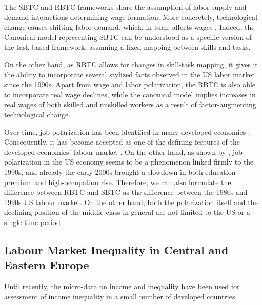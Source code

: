 \documentclass[11pt]{article}
\begin{document}
The SBTC and RBTC frameworks share the assumption of labor supply and demand interactions determining wage formation. More concretely, technological change causes shifting labor demand, which, in turn, affects wages \citep{mishel2013assessing}. Indeed, the Canonical model representing SBTC can be understood as a specific version of the task-based framework, assuming a fixed mapping between skills and tasks.

On the other hand, as RBTC allows for changes in skill-task mapping, it gives it the ability to incorporate several stylized facts observed in the US labor market since the 1990s. Apart from wage and labor polarization, the RBTC is also able to incorporate real wage declines, while the canonical model implies increases in real wages of both skilled and unskilled workers as a result of factor-augmenting technological change.


 Over time, job polarization has been identified in many developed economies \citep{rodrik2020economic, oecd2017}. Consequently, it has become accepted as one of the defining features of the developed economies' labour market \citep{howell2019declining}. On the other hand, as shown by \citet{mishel2013assessing}, job polarization in the US economy seems to be a phenomenon linked firmly to the 1990s, and already the early 2000s brought a slowdown in both education premium and high-occupation rise. Therefore, we can also formulate the difference between RBTC and SBTC as the difference between the 1980s and 1990s US labour market. On the other hand, both the polarization itself and the declining position of the middle class in general are not limited to the US or a single time period \citep{temin2018vanishing, rodrik2020economic}. %



\subsection{Labour Market Inequality in Central and Eastern Europe}
Until recently, the micro-data on income and inequality have been used for assessment of income inequality in a small number of developed countries.
\end{document}
